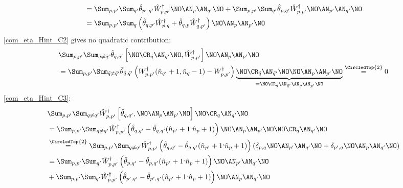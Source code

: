 \begin{appendix}
\begin{itemize}
\begin{align}
&=\Sum_{p, p^\prime}\Sum_{q^\prime} \hat\theta_{ p^\prime, q^\prime}\hat W_{p,p^\prime}^\dagger\NO\AN_p\AN_{q^\prime}\NO+\Sum_{p, p^\prime}\Sum_{q^\prime}\hat\theta_{ p, q^\prime}\hat W_{p,p^\prime}^\dagger\NO\AN_{p^\prime}\AN_{q^\prime}\NO\nonumber\\
&=\Sum_{p, p^\prime}\Sum_{q}\left(\hat\theta_{ q, p^\prime}\hat W_{p,q}^\dagger+\hat\theta_{ q, p}\hat W_{q,p^\prime}^\dagger\right)\NO\AN_{p}\AN_{p^\prime}\NO
\end{align}
\ref{com_eta_Hint_C2} gives no quadratic contribution:
\begin{align}
&\Sum_{p, p^\prime}\Sum_{\tilde q\neq\tilde q^\prime}\hat\theta_{\tilde q,\tilde q^\prime}\left[\NO\CR_{\tilde q}\AN_{\tilde q^\prime}\NO,\hat W_{p,p^\prime}^\dagger\right]\NO\AN_p\AN_{p^\prime}\NO\nonumber\\
&=\Sum_{p, p^\prime}\Sum_{\tilde q\neq\tilde q^\prime}\hat\theta_{\tilde q,\tilde q^\prime}\left(W_{p,p^\prime}^\dagger(\hat n_{q^\prime}+1,\hat n_q-1)-W_{p,p^\prime}^\dagger\right)\underbrace{\NO\CR_{\tilde q}\AN_{\tilde q^\prime}\NO\NO\AN_p\AN_{p^\prime}\NO}_{=\NO\CR_{\tilde q}\AN_{\tilde q^\prime}\AN_p\AN_{p^\prime}\NO}\overset{\CircledTop{2}}{=}0
\end{align}
\ref{com_eta_Hint_C3}:
\begin{align}
&\Sum_{p, p^\prime}\Sum_{ q\neq q^\prime}\hat W_{p,p^\prime}^\dagger \left[\hat\theta_{ q, q^\prime},\NO\AN_p\AN_{p^\prime}\NO\right]\NO\CR_{ q}\AN_{ q^\prime}\NO\nonumber\\
&=\Sum_{p, p^\prime}\Sum_{ q\neq q^\prime}\hat W_{p,p^\prime}^\dagger \left(\hat\theta_{ q, q^\prime}-\hat\theta_{ q, q^\prime}(\hat n_{p^\prime}+1^,\hat n_p+1)\right)\NO\AN_p\AN_{p^\prime}\NO\NO\CR_{ q}\AN_{ q^\prime}\NO\\ 
&\overset{\CircledTop{2}}{=}\Sum_{p, p^\prime}\Sum_{ q\neq q^\prime}\hat W_{p,p^\prime}^\dagger \left(\hat\theta_{ q, q^\prime}-\hat\theta_{ q, q^\prime}(\hat n_{p^\prime}+1^,\hat n_p+1)\right)\left(\delta_{p,q}\NO\AN_{p^\prime}\AN_{q^\prime}\NO+\delta_{p^\prime,q}\NO\AN_p\AN_{q^\prime}\NO\right)\nonumber\\
&=\Sum_{p, p^\prime}\Sum_{q^\prime}\hat W_{p,p^\prime}^\dagger \left(\hat\theta_{ p, q^\prime}-\hat\theta_{ p, q^\prime}(\hat n_{p^\prime}+1^,\hat n_p+1)\right)\NO\AN_{p^\prime}\AN_{q^\prime}\NO\\
&+\Sum_{p, p^\prime}\Sum_{q^\prime}\hat W_{p,p^\prime}^\dagger \left(\hat\theta_{ p^\prime, q^\prime}-\hat\theta_{ p^\prime, q^\prime}(\hat n_{p^\prime}+1^,\hat n_p+1)\right)\NO\AN_p\AN_{q^\prime}\NO\nonumber\\

\end{align}
\end{itemize}
\end{appendix}
